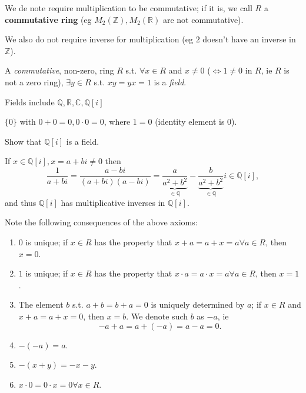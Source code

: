 \documentclass[12pt,oneside]{article}
\begin{document}
\begin{remark}
  We de note require multiplication to be commutative; if it is, we call $R$ a \textbf{commutative ring} (eg $M_2(\mathbb{Z}), M_2(\mathbb{R})$ are not commutative).

  We also do not require inverse for multiplication (eg $2$ doesn't have an inverse in $\mathbb{Z}$).
\end{remark}

\begin{definition}[Field]
  A \emph{commutative}, non-zero, ring $R$  s.t. $\forall x \in R$ and $x \neq 0$ ($\iff 1 \neq 0 $ in $R$, ie $R$ is not a zero ring), $\exists y \in R$ s.t. $xy=yx=1$ is a \emph{field}.

  Fields include $\mathbb{Q}, \mathbb{R}, \mathbb{C}, \mathbb{Q}[i]$
\end{definition}

\begin{definition}
  $\{0\}$ with $0 + 0 = 0, 0 \cdot 0 = 0$, where $1 = 0$ (identity element is 0). 
\end{definition}

\begin{example}
  Show that $\mathbb{Q}[i]$ is a field.

  If $x \in \mathbb{Q}[i], x = a + b i \neq 0$ then \[\frac{1}{a+bi} = \frac{a-bi}{(a+bi)(a-bi)} = \underbrace{\frac{a}{a^2+b^2}}_{\in \mathbb{Q}} - \underbrace{\frac{b}{a^2+b^2}}_{\in \mathbb{Q}}i \in \mathbb{Q}[i],\] and thus $\mathbb{Q}[i]$ has multiplicative inverses in $\mathbb{Q}[i]$.
\end{example}

\begin{corollary}
  Note the following consequences of the above axioms:
  \begin{enumerate}
    \item $0$ is unique; if $x \in R$ has the property that $x + a = a+x = a \forall a \in R$, then $x = 0$.
    \item $1$ is unique; if $x \in R$ has the property that $x\cdot a = a \cdot x = a \forall a \in R$, then $x = 1$.
    \item The element $b$ s.t. $a+b = b+a = 0$ is uniquely determined by $a$; if $x \in R$ and $x + a = a+x = 0$, then $x = b$. We denote such $b$ as $-a$, ie \[-a + a = a+(-a) = a-a = 0.\]
    \item $-(-a)=a$.
    \item $-(x+y)=-x-y$.
    \item $x\cdot 0 = 0 \cdot x = 0 \forall x \in R$.
   \end{enumerate}
\end{corollary}
\end{document}
